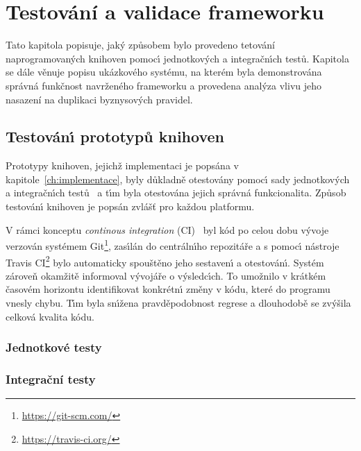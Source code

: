 

\chapter{Testování a validace frameworku}\label{ch:testovani}

Tato kapitola popisuje, jak\'y způsobem bylo provedeno
tetování naprogramovan\'ych knihoven pomoc\'{\i}
jednotkov\'ych a integračn\'{\i}ch testů.
Kapitola se dále věnuje popisu ukázkového systému, na kterém
byla demonstrována správná funkčnost navrženého frameworku
a provedena analýza vlivu jeho nasazení na duplikaci
byznysových pravidel.

\section{Testován\'{\i} prototypů knihoven}

Prototypy knihoven, jejichž implementaci je popsána v kapitole~\ref{ch:implementace},
byly důkladně otestovány pomoc\'{\i} sady jednotkov\'ych a integračn\'{\i}ch testů~\cite{luo2001software}
a t\'{\i}m byla otestována jejich správná funkcionalita. Způsob
testován\'{\i} knihoven je popsán zvlášť pro každou platformu.

V rámci konceptu \textit{continous integration} (\gls{CI})~\cite{fowler2006continuous}
byl kód po celou dobu v\'yvoje verzován systémem Git\footnote{\url{https://git-scm.com/}},
zas\'{\i}lán do centráln\'{\i}ho repozitáře a s pomoc\'{\i}
nástroje Travis \gls{CI}\footnote{\url{https://travis-ci.org/}}
bylo automaticky spouštěno jeho sestaven\'{\i} a otestován\'{\i}.
Systém zároveň okamžitě informoval v\'yvojáře o v\'ysledc\'{\i}ch.
To umožnilo v krátkém časovém horizontu identifikovat konkrétn\'{\i} změny
v kódu, které do programu vnesly chybu. T\'{\i}m byla sn\'{\i}žena
pravděpodobnost regrese a dlouhodobě se zv\'yšila celková kvalita kódu.

\subsection{Jednotkové testy}


\subsection{Integrační testy}


